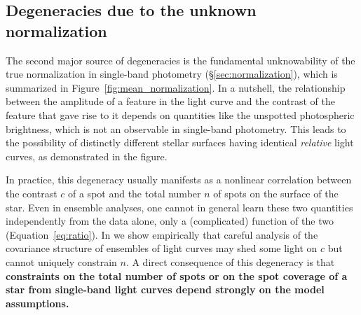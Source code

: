 \documentclass[modern]{aastex62}
\begin{document}
\subsection{Degeneracies due to the unknown normalization}

The second major source of degeneracies is the fundamental
unknowability of the true normalization in single-band
photometry (\S\ref{sec:normalization}), which is summarized in
Figure~\ref{fig:mean_normalization}. In a nutshell, the relationship
between the amplitude of a feature in the light curve and the contrast
of the feature that gave rise to it depends on quantities like the
unspotted photospheric brightness, which is not an observable in
single-band photometry. This leads to the possibility of distinctly
different stellar surfaces having identical \emph{relative}
light curves, as demonstrated in the figure.

In practice, this degeneracy usually manifests as a nonlinear correlation
between the contrast $c$ of a spot and the total number $n$
of spots on the surface of the star. Even in ensemble analyses,
one cannot in general learn these two quantities independently from
the data alone,
only a (complicated) function of the two (Equation~\ref{eq:ratio}).
In  we show empirically that
careful analysis of the covariance structure of ensembles of light curves
may shed some light on $c$ but cannot uniquely constrain $n$.
%
A direct consequence of this degeneracy is that \textbf{constraints on
    the total number of spots or on the spot coverage of a star from single-band light curves
    depend strongly on the model assumptions.}
\end{document}
